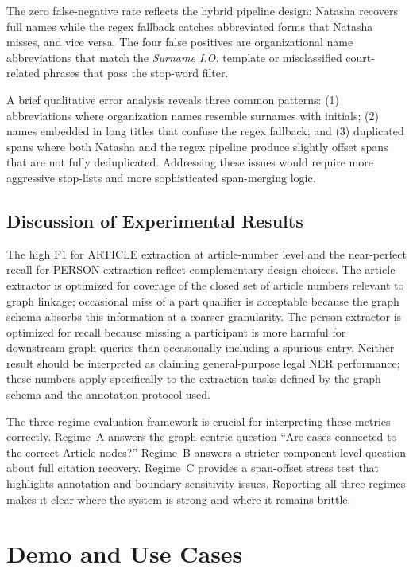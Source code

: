 \documentclass[11pt]{article}
\begin{document}
The zero false-negative rate reflects the hybrid pipeline design: Natasha recovers full names while the regex fallback catches abbreviated forms that Natasha misses, and vice versa. The four false positives are organizational name abbreviations that match the \textit{Surname I.O.} template or misclassified court-related phrases that pass the stop-word filter.

A brief qualitative error analysis reveals three common patterns: (1) abbreviations where organization names resemble surnames with initials; (2) names embedded in long titles that confuse the regex fallback; and (3) duplicated spans where both Natasha and the regex pipeline produce slightly offset spans that are not fully deduplicated. Addressing these issues would require more aggressive stop-lists and more sophisticated span-merging logic.

\subsection{Discussion of Experimental Results}

The high F1 for ARTICLE extraction at article-number level and the near-perfect recall for PERSON extraction reflect complementary design choices. The article extractor is optimized for coverage of the closed set of article numbers relevant to graph linkage; occasional miss of a part qualifier is acceptable because the graph schema absorbs this information at a coarser granularity. The person extractor is optimized for recall because missing a participant is more harmful for downstream graph queries than occasionally including a spurious entry. Neither result should be interpreted as claiming general-purpose legal NER performance; these numbers apply specifically to the extraction tasks defined by the graph schema and the annotation protocol used.

The three-regime evaluation framework is crucial for interpreting these metrics correctly. Regime~A answers the graph-centric question ``Are cases connected to the correct Article nodes?'' Regime~B answers a stricter component-level question about full citation recovery. Regime~C provides a span-offset stress test that highlights annotation and boundary-sensitivity issues. Reporting all three regimes makes it clear where the system is strong and where it remains brittle.

\section{Demo and Use Cases}
\end{document}
